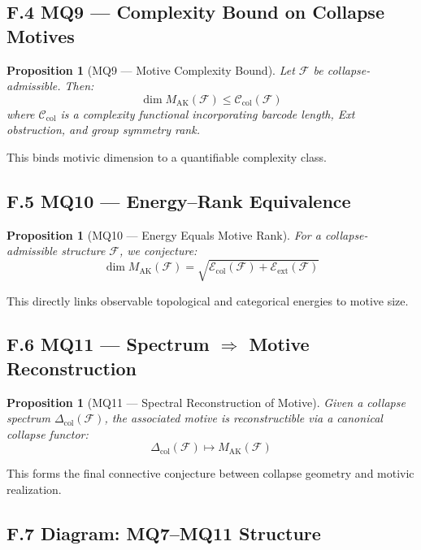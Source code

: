 \documentclass[11pt]{article}
\newtheorem{proposition}[theorem]{Proposition}
\begin{document}
\subsection*{F.4 MQ9 — Complexity Bound on Collapse Motives}

\begin{proposition}[MQ9 — Motive Complexity Bound]
Let $\mathcal{F}$ be collapse-admissible. Then:
\[
\dim M_{\mathrm{AK}}(\mathcal{F}) \leq \mathcal{C}_{\mathrm{col}}(\mathcal{F})
\]
where $\mathcal{C}_{\mathrm{col}}$ is a complexity functional incorporating barcode length, Ext obstruction, and group symmetry rank.
\end{proposition}

This binds motivic dimension to a quantifiable complexity class.

\subsection*{F.5 MQ10 — Energy–Rank Equivalence}

\begin{proposition}[MQ10 — Energy Equals Motive Rank]
For a collapse-admissible structure $\mathcal{F}$, we conjecture:
\[
\dim M_{\mathrm{AK}}(\mathcal{F}) = \sqrt{\mathcal{E}_{\mathrm{col}}(\mathcal{F}) + \mathcal{E}_{\mathrm{ext}}(\mathcal{F})}
\]
\end{proposition}

This directly links observable topological and categorical energies to motive size.

\subsection*{F.6 MQ11 — Spectrum $\Rightarrow$ Motive Reconstruction}

\begin{proposition}[MQ11 — Spectral Reconstruction of Motive]
Given a collapse spectrum $\Delta_{\mathrm{col}}(\mathcal{F})$, the associated motive is reconstructible via a canonical collapse functor:
\[
\Delta_{\mathrm{col}}(\mathcal{F}) \mapsto M_{\mathrm{AK}}(\mathcal{F})
\]
\end{proposition}

This forms the final connective conjecture between collapse geometry and motivic realization.

\subsection*{F.7 Diagram: MQ7–MQ11 Structure}
\end{document}
